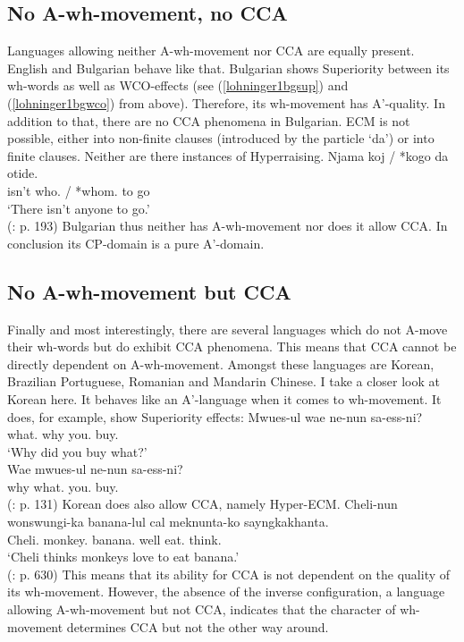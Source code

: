 \documentclass[output=paper,colorlinks,citecolor=brown]{langscibook}
\begin{document}
\subsection{No A-wh-movement, no CCA}
Languages allowing neither A-wh-movement nor CCA are equally present. English and Bulgarian behave like that. Bulgarian shows Superiority between its wh-words as well as WCO-effects (see (\ref{lohninger1bgsup}) and (\ref{lohninger1bgwco}) from above). Therefore, its wh-movement has A'-quality. In addition to that, there are no CCA phenomena in Bulgarian. ECM is not possible, either into non-finite clauses (introduced by the particle `da') or into finite clauses. Neither are there instances of Hyperraising.
\ea
\gll Njama koj / *kogo da otide.\\
isn't who. / *whom. to go\\
\glt `There isn't anyone to go.'\\
(\citealp{rudin21986aspects}: p. 193)
\z
Bulgarian thus neither has A-wh-movement nor does it allow CCA. In conclusion its CP-domain is a pure A'-domain. 



\subsection{No A-wh-movement but CCA}
Finally and most interestingly, there are several languages which do not A-move their wh-words but do exhibit CCA phenomena. This means that CCA cannot be directly dependent on A-wh-movement. Amongst these languages are Korean, Brazilian Portuguese, Romanian and Mandarin Chinese. I take a closer look at Korean here. It behaves like an A'-language when it comes to wh-movement. It does, for example, show Superiority effects:
\ea
\ea
\gll Mwues-ul wae ne-nun sa-ess-ni?\\
what. why you. buy.\\
\glt `Why did you buy what?'\\
\ex\gll * Wae mwues-ul ne-nun sa-ess-ni?\\
{} why what. you. buy.\\
\glt{} 
(\citealp{jeong2003deriving}: p. 131)
\z 
\z
Korean does also allow CCA, namely Hyper-ECM.
\ea\gll Cheli-nun wonswungi-ka banana-lul cal meknunta-ko sayngkakhanta.\\
Cheli. monkey. banana. well eat. think.\\
\glt `Cheli thinks monkeys love to eat banana.’ \\ (\citealp{yoon2007raising}: p. 630)
\z
This means that its ability for CCA is not dependent on the quality of its wh-movement. However, the absence of the inverse configuration, a language allowing A-wh-movement but not CCA, indicates that the character of wh-movement determines CCA but not the other way around.
\end{document}
